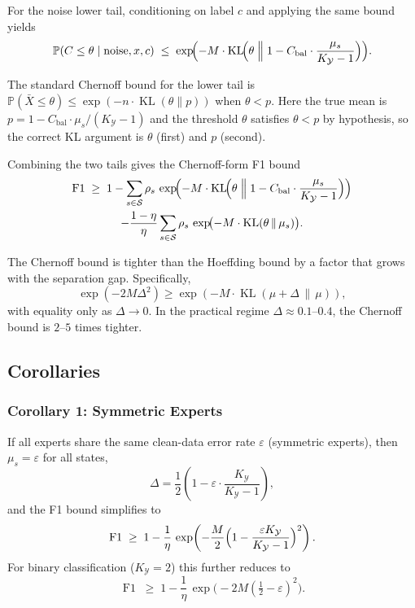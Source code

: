 For the noise lower tail, conditioning on label $c$ and applying the same
bound yields
\[
\mathbb{P}(C \leq \theta \mid \text{noise}, x, c)
\;\leq\; \exp\!\Bigl(
  -M \cdot \operatorname{KL}\!\Bigl(\theta \;\Big\|\;
   1 - C_{\text{bal}}\cdot\frac{\mu_s}{K_{\mathcal{Y}}-1}\Bigr)
\Bigr).
\]

\begin{remark}[KL direction]
\label{remark:kl-direction}
The standard Chernoff bound for the lower tail is
$\mathbb{P}(\bar{X} \leq \theta) \leq \exp(-n \cdot \operatorname{KL}(\theta \| p))$
when $\theta < p$. Here the true mean is
$p = 1 - C_{\text{bal}}\cdot\mu_s/(K_{\mathcal{Y}}-1)$ and the threshold
$\theta$ satisfies $\theta < p$ by hypothesis, so the correct KL argument is
$\theta$ (first) and $p$ (second).
\end{remark}

Combining the two tails gives the Chernoff-form F1 bound
\begin{multline}
\operatorname{F1} \;\geq\; 1
- \sum_{s \in \mathcal{S}} \rho_s \,
\exp\!\Bigl(-M \cdot \operatorname{KL}\!\Bigl(\theta \;\Big\|\;
  1 - C_{\text{bal}}\cdot\frac{\mu_s}{K_{\mathcal{Y}}-1}\Bigr)\Bigr) \\
- \frac{1-\eta}{\eta} \sum_{s \in \mathcal{S}} \rho_s \,
\exp\!\bigl(-M \cdot \operatorname{KL}(\theta \,\|\, \mu_s)\bigr).
\label{eq:f1-bound-chernoff}
\end{multline}

The Chernoff bound is tighter than the Hoeffding bound by a factor that grows
with the separation gap. Specifically,
\[
\exp(-2M\Delta^2) \geq \exp(-M \cdot \operatorname{KL}(\mu + \Delta \,\|\, \mu)),
\]
with equality only as $\Delta \to 0$. In the practical regime
$\Delta \approx 0.1$--$0.4$, the Chernoff bound is $2$--$5$ times tighter.

\subsection{Corollaries}
\label{sec:thm1:corollaries}

\subsubsection*{Corollary 1: Symmetric Experts}
If all experts share the same clean-data error rate $\varepsilon$ (symmetric
experts), then $\mu_s = \varepsilon$ for all states,
\[
\Delta = \frac12\!\left(1 - \varepsilon\cdot\frac{K_{\mathcal{Y}}}{K_{\mathcal{Y}}-1}\right),
\]
and the F1 bound simplifies to
\begin{equation}
\operatorname{F1} \;\geq\; 1 - \frac{1}{\eta}\,
\exp\!\left(-\frac{M}{2}\Bigl(1 - \frac{\varepsilon K_{\mathcal{Y}}}{K_{\mathcal{Y}}-1}\Bigr)^2\right).
\label{eq:cor-symmetric}
\end{equation}
For binary classification ($K_{\mathcal{Y}}=2$) this further reduces to
\[
\operatorname{F1} \;\geq\; 1 - \frac{1}{\eta}\,
\exp\!\bigl(-2M(\tfrac12 - \varepsilon)^2\bigr).
\]

